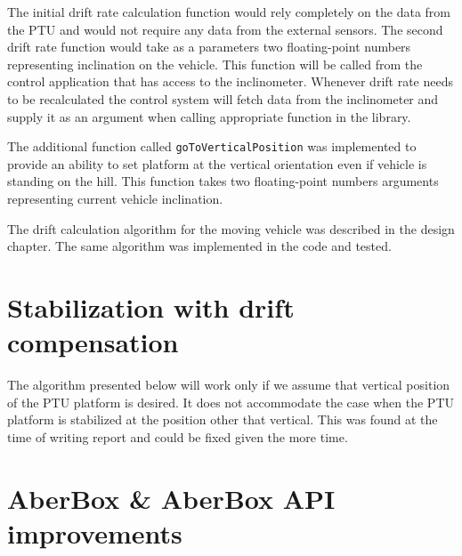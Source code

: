 The initial drift rate calculation function would rely completely on the data from the PTU and would not require any data from the external sensors. The second drift rate function would take as a parameters two floating-point numbers representing inclination on the vehicle. This function will be called from the control application that has access to the inclinometer. Whenever drift rate needs to be recalculated the control system will fetch data from the inclinometer and supply it as an argument when calling appropriate function in the library.

The additional function called \texttt{goToVerticalPosition} was implemented to provide an ability to set platform at the vertical orientation even if vehicle is standing on the hill. This function takes two floating-point numbers arguments representing current vehicle inclination. 

The drift calculation algorithm for the moving vehicle was described in the design chapter. The same algorithm was implemented in the code and tested.    

  
\section{Stabilization with drift compensation}
 
 The algorithm presented below will work only if we assume that vertical position of the PTU platform is desired. It does not accommodate the case when the PTU  platform is stabilized at the position other that vertical. This was found at the time of writing report and could be fixed given the more time.
 
 \section{AberBox \& AberBox API improvements}
